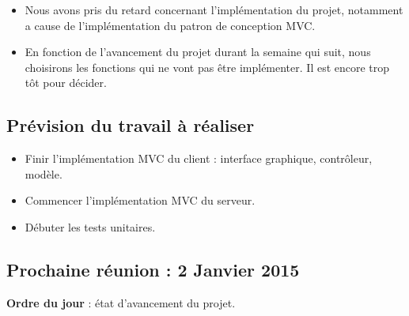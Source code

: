 \documentclass[12pt,a4paper]{article}
\begin{document}
\begin{itemize}[label = $\blacktriangleright$]
\item Nous avons pris du retard concernant l'implémentation du projet, notamment a cause de l'implémentation du patron de conception MVC.

\item En fonction de l'avancement du projet durant la semaine qui suit, nous choisirons les fonctions qui ne vont pas être implémenter. Il est encore trop tôt pour décider.
\end{itemize}

\subsection*{Prévision du travail à réaliser}

\begin{itemize}[label = $\blacktriangleright$]
\item Finir l'implémentation MVC du client : interface graphique, contrôleur, modèle.
\item Commencer l'implémentation MVC du serveur.
\item Débuter les tests unitaires.
\end{itemize}

\subsection*{Prochaine réunion : 2 Janvier 2015}

\textbf{Ordre du jour} : état d'avancement du projet.\\
\end{document}
